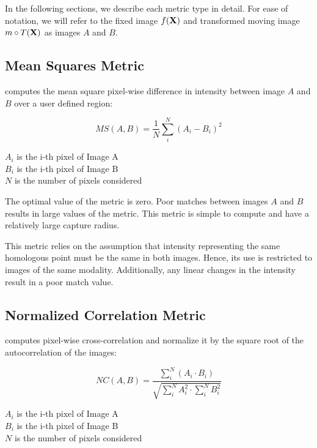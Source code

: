 In the following sections, we describe each metric type in detail. 
For ease of notation, we will refer to the fixed image $f(\bf{X})$ 
and transformed moving image $m \circ T(\bf{X})$ as images $A$ and $B$.

\subsection{Mean Squares Metric}
\label{sec:MeanSquaresMetric}
 computes the mean square pixel-wise difference in intensity
between image $A$ and $B$ over a user defined region:

\begin{equation}
MS(A,B) = \frac{1}{N} \sum_i^N \left( A_i - B_i \right)^2
\end{equation}
\begin{center}
$A_i$ is the i-th pixel of Image A\\ 
$B_i$ is the i-th pixel of Image B\\
$N$ is the number of pixels considered
\end{center}

The optimal value of the metric is zero. Poor matches between images $A$ and
$B$ results in large values of the metric. This metric is simple to compute and
have a relatively large capture radius.

This metric relies on the assumption that intensity representing the same
homologous point must be the same in both images. Hence, its use is restricted
to images of the same modality. Additionally, any linear changes in the
intensity result in a poor match value.

\subsection{Normalized Correlation Metric}
\label{sec:NormalizedCorrelationMetric}
 computes pixel-wise
cross-correlation and normalize it by the square root of the autocorrelation of
the images:

\begin{equation}
NC(A,B) = \frac{ \sum_i^N \left( A_i \cdot B_i \right) }
         { \sqrt { \sum_i^N A_i^2  \cdot \sum_i^N B_i^2 } }
\end{equation}
\begin{center}
$A_i$ is the i-th pixel of Image A\\ 
$B_i$ is the i-th pixel of Image B\\
$N$ is the number of pixels considered
\end{center}

